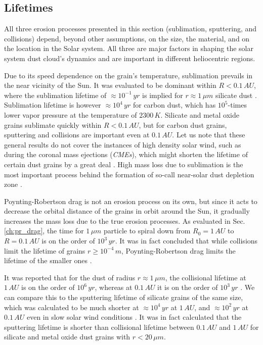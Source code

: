 \subsection{Lifetimes}

All three erosion processes presented in this section (sublimation, sputtering, and collisions) depend, beyond other assumptions, on the size, the material, and on the location in the Solar system. All three are major factors in shaping the solar system dust cloud's dynamics and are important in different heliocentric regions. 

Due to its speed dependence on the grain's temperature, sublimation prevails in the near vicinity of the Sun. It was evaluated to be dominant within $R < 0.1 \, \si{AU}$, where the sublimation lifetime of $\approx 10^{-1} \, \si{yr}$ is implied for $r \approx 1 \, \si{\mu m}$ silicate dust \citep{baumann2020dust}. Sublimation lifetime is however $\approx 10^{4} \, \si{yr}$ for carbon dust, which has $10^5$-times lower vapor pressure at the temperature of $2300\, \si{K}$. Silicate and metal oxide grains sublimate quickly within $R<0.1\, \si{AU}$, but for carbon dust grains, sputtering and collisions are important even at $0.1 \, \si{AU}$. Let us note that these general results do not cover the instances of high density solar wind, such as during the coronal mass ejections (\textit{CMEs}), which might shorten the lifetime of certain dust grains by a great deal \citep{baumann2020dust}. High mass loss due to sublimation is the most important process behind the formation of so-call near-solar dust depletion zone \citep{russell1929meteoric}. 

Poynting-Robertson drag is not an erosion process on its own, but since it acts to decrease the orbital distance of the grains in orbit around the Sun, it gradually increases the mass loss due to the true erosion processes. As evaluated in Sec. \ref{ch:pr_drag}, the time for $1 \, \si{\mu m}$ particle to spiral down from $R_0 = 1 \, \si{AU}$ to $R = 0.1 \, \si{AU}$ is on the order of $10^3 \, \si{yr}$. It was in fact concluded that while collisions limit the lifetime of grains $r \geq 10^{-4} \, \si{m}$, Poynting-Robertson drag limits the lifetime of the smaller ones \citep{grun1985collisional}. 

It was reported that for the dust of radius $r \approx 1 \, \si{\mu m}$, the collisional lifetime at $1\,\si{AU}$ is on the order of $10^6 \, \si{yr}$, whereas at $0.1\,\si{AU}$ it is on the order of $10^3 \, \si{yr}$ \citep{grun1985collisional}. We can compare this to the sputtering lifetime of silicate grains of the same size, which was calculated to be much shorter at  $\approx 10^4 \, \si{yr}$ at $1\,\si{AU}$, and $\approx 10^2 \, \si{yr}$ at $0.1\,\si{AU}$ even in slow solar wind conditions \citep{klepper2021influence}. It was in fact calculated \citep{klepper2021influence} that the sputtering lifetime is shorter than collisional lifetime between $0.1 \, \si{AU}$ and $1 \, \si{AU}$ for silicate and metal oxide dust grains with $r<20 \, \si{\mu m}$.

